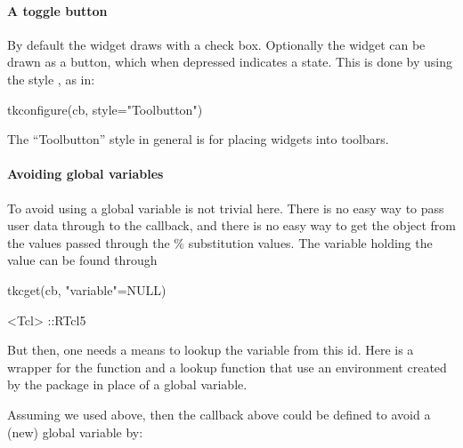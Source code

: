 \paragraph{A toggle button}

By default the widget draws with a check box. Optionally the widget
can be drawn as a button, which when depressed indicates a 
state. This is done by using the style , as in:
\begin{Schunk}
\begin{Sinput}
 tkconfigure(cb, style="Toolbutton")
\end{Sinput}
\end{Schunk}

The ``Toolbutton'' style in general is for placing widgets into toolbars.


\paragraph{Avoiding global variables}
To avoid using a global variable is not trivial here. There is no easy
way to pass user data through to the callback, and there is no easy
way to get the \R\/ object from the values passed through the \%
substitution values. The variable holding the value can be found
through
\begin{Schunk}
\begin{Sinput}
 tkcget(cb, "variable"=NULL)
\end{Sinput}
\begin{Soutput}
<Tcl> ::RTcl5 
\end{Soutput}
\end{Schunk}

But then, one needs a means to lookup the variable from this id. Here is a
wrapper for the  function and a lookup function that
use an environment created by the  package in place of a
global variable.

\begin{Schunk}
\end{Schunk}

Assuming we used  above, then the callback above
could be defined to avoid a (new) global variable by:


